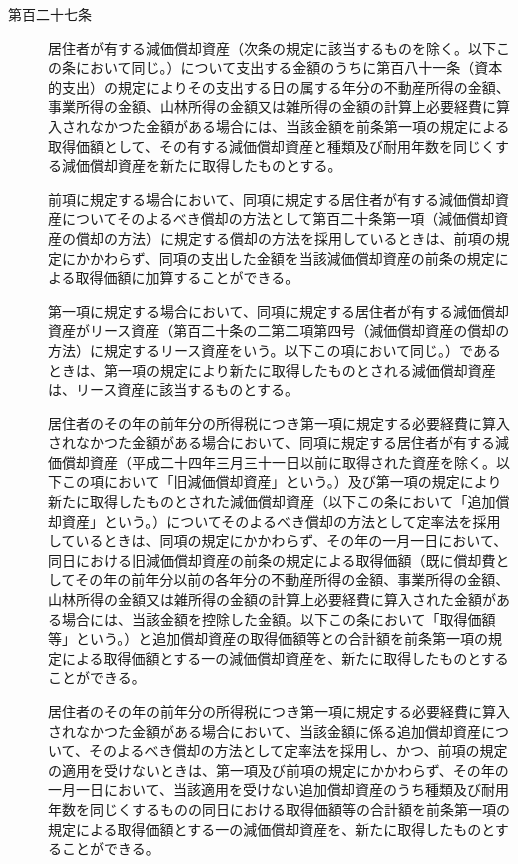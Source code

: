 \documentclass[twocolumn,a4j,10pt]{ltjtarticle}
\begin{document}
\begin{description}
\item[第百二十七条]居住者が有する減価償却資産（次条の規定に該当するものを除く。以下この条において同じ。）について支出する金額のうちに第百八十一条（資本的支出）の規定によりその支出する日の属する年分の不動産所得の金額、事業所得の金額、山林所得の金額又は雑所得の金額の計算上必要経費に算入されなかつた金額がある場合には、当該金額を前条第一項の規定による取得価額として、その有する減価償却資産と種類及び耐用年数を同じくする減価償却資産を新たに取得したものとする。
\item[]前項に規定する場合において、同項に規定する居住者が有する減価償却資産についてそのよるべき償却の方法として第百二十条第一項（減価償却資産の償却の方法）に規定する償却の方法を採用しているときは、前項の規定にかかわらず、同項の支出した金額を当該減価償却資産の前条の規定による取得価額に加算することができる。
\item[]第一項に規定する場合において、同項に規定する居住者が有する減価償却資産がリース資産（第百二十条の二第二項第四号（減価償却資産の償却の方法）に規定するリース資産をいう。以下この項において同じ。）であるときは、第一項の規定により新たに取得したものとされる減価償却資産は、リース資産に該当するものとする。
\item[]居住者のその年の前年分の所得税につき第一項に規定する必要経費に算入されなかつた金額がある場合において、同項に規定する居住者が有する減価償却資産（平成二十四年三月三十一日以前に取得された資産を除く。以下この項において「旧減価償却資産」という。）及び第一項の規定により新たに取得したものとされた減価償却資産（以下この条において「追加償却資産」という。）についてそのよるべき償却の方法として定率法を採用しているときは、同項の規定にかかわらず、その年の一月一日において、同日における旧減価償却資産の前条の規定による取得価額（既に償却費としてその年の前年分以前の各年分の不動産所得の金額、事業所得の金額、山林所得の金額又は雑所得の金額の計算上必要経費に算入された金額がある場合には、当該金額を控除した金額。以下この条において「取得価額等」という。）と追加償却資産の取得価額等との合計額を前条第一項の規定による取得価額とする一の減価償却資産を、新たに取得したものとすることができる。
\item[]居住者のその年の前年分の所得税につき第一項に規定する必要経費に算入されなかつた金額がある場合において、当該金額に係る追加償却資産について、そのよるべき償却の方法として定率法を採用し、かつ、前項の規定の適用を受けないときは、第一項及び前項の規定にかかわらず、その年の一月一日において、当該適用を受けない追加償却資産のうち種類及び耐用年数を同じくするものの同日における取得価額等の合計額を前条第一項の規定による取得価額とする一の減価償却資産を、新たに取得したものとすることができる。
\end{description}
\end{document}
